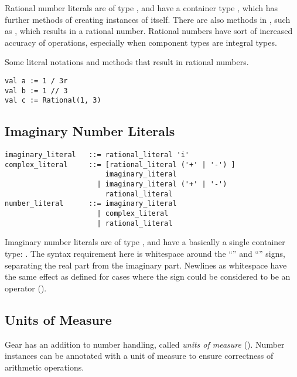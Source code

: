 Rational number literals are of type , and have a container type , which has further methods of creating instances of itself. There are also methods in , such as \code{//}, which results in a rational number. Rational numbers have sort of increased accuracy of operations, especially when component types are integral types. 

\example Some literal notations and methods that result in rational numbers. 
\begin{lstlisting}
val a := 1 / 3r
val b := 1 // 3
val c := Rational(1, 3)
\end{lstlisting}







\subsection{Imaginary Number Literals}
\label{sec:imaginaryliterals}

\syntax\begin{lstlisting}
imaginary_literal   ::= rational_literal 'i'
complex_literal     ::= [rational_literal ('+' | '-') ]
                        imaginary_literal
	                  | imaginary_literal ('+' | '-') 
	                    rational_literal
number_literal      ::= imaginary_literal
	                  | complex_literal
	                  | rational_literal
\end{lstlisting}

Imaginary number literals are of type , and have a basically a single container type: . The syntax requirement here is whitespace around the ``\code{+}'' and ``\code{+}'' signs, separating the real part from the imaginary part. Newlines as whitespace have the same effect as defined for cases where the sign could be considered to be an operator ().





\subsection{Units of Measure}
\label{sec:unitsofmeasuresyntax}

Gear has an addition to number handling, called {\em units of measure} (). Number instances can be annotated with a unit of measure to ensure correctness of arithmetic operations. 

